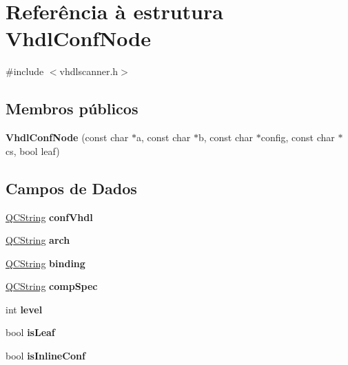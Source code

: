 \hypertarget{struct_vhdl_conf_node}{\section{Referência à estrutura Vhdl\-Conf\-Node}
\label{struct_vhdl_conf_node}
}


{\ttfamily \#include $<$vhdlscanner.\-h$>$}

\subsection*{Membros públicos}
\begin{DoxyCompactItemize}
\item 
\hypertarget{struct_vhdl_conf_node_a712a48334954b2051f6d6ce7508547bd}{{\bfseries Vhdl\-Conf\-Node} (const char $\ast$a, const char $\ast$b, const char $\ast$config, const char $\ast$cs, bool leaf)}\label{struct_vhdl_conf_node_a712a48334954b2051f6d6ce7508547bd}

\end{DoxyCompactItemize}
\subsection*{Campos de Dados}
\begin{DoxyCompactItemize}
\item 
\hypertarget{struct_vhdl_conf_node_a0b8c1077c2eb785536ae0e83f7e499c3}{\hyperlink{class_q_c_string}{Q\-C\-String} {\bfseries conf\-Vhdl}}\label{struct_vhdl_conf_node_a0b8c1077c2eb785536ae0e83f7e499c3}

\item 
\hypertarget{struct_vhdl_conf_node_a09547ffaa6e43d7d1a6808ca597216e4}{\hyperlink{class_q_c_string}{Q\-C\-String} {\bfseries arch}}\label{struct_vhdl_conf_node_a09547ffaa6e43d7d1a6808ca597216e4}

\item 
\hypertarget{struct_vhdl_conf_node_a9b589c3d884996a0885866ae8576fa70}{\hyperlink{class_q_c_string}{Q\-C\-String} {\bfseries binding}}\label{struct_vhdl_conf_node_a9b589c3d884996a0885866ae8576fa70}

\item 
\hypertarget{struct_vhdl_conf_node_a11ed3f876070916742cc783d11e3e66d}{\hyperlink{class_q_c_string}{Q\-C\-String} {\bfseries comp\-Spec}}\label{struct_vhdl_conf_node_a11ed3f876070916742cc783d11e3e66d}

\item 
\hypertarget{struct_vhdl_conf_node_acf4d33ee4cff36f69b924471174dcb11}{int {\bfseries level}}\label{struct_vhdl_conf_node_acf4d33ee4cff36f69b924471174dcb11}

\item 
\hypertarget{struct_vhdl_conf_node_ab38da034b76749698d96ee2ed52f54d7}{bool {\bfseries is\-Leaf}}\label{struct_vhdl_conf_node_ab38da034b76749698d96ee2ed52f54d7}

\item 
\hypertarget{struct_vhdl_conf_node_a879355734a62db5d67e44ffec5df2eef}{bool {\bfseries is\-Inline\-Conf}}\label{struct_vhdl_conf_node_a879355734a62db5d67e44ffec5df2eef}

\end{DoxyCompactItemize}


